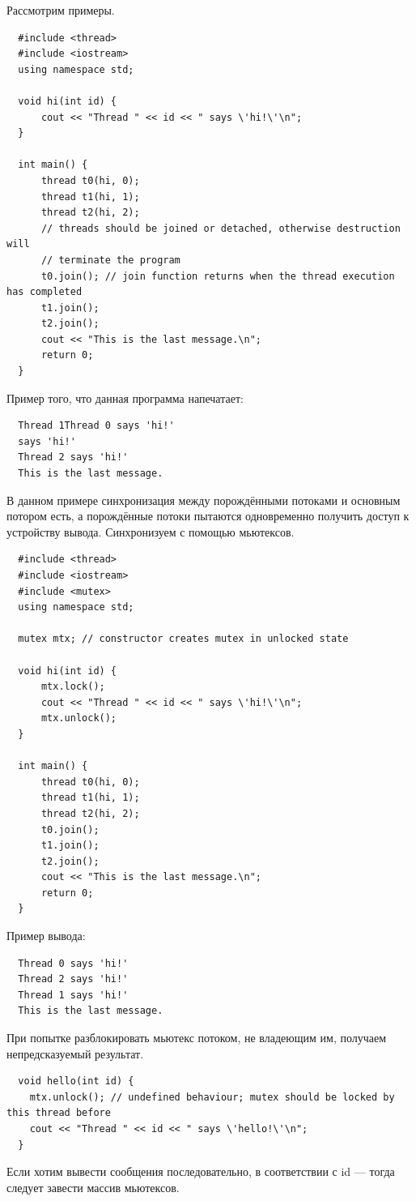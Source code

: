 \documentclass{book}
\begin{document}
Рассмотрим примеры.
\begin{verbatim}
  #include <thread>
  #include <iostream>
  using namespace std;

  void hi(int id) {
      cout << "Thread " << id << " says \'hi!\'\n";
  }

  int main() {
      thread t0(hi, 0);
      thread t1(hi, 1);
      thread t2(hi, 2);
      // threads should be joined or detached, otherwise destruction will
      // terminate the program
      t0.join(); // join function returns when the thread execution has completed
      t1.join();
      t2.join();
      cout << "This is the last message.\n";
      return 0;
  }
\end{verbatim}
Пример того, что данная программа напечатает:
\begin{verbatim}
  Thread 1Thread 0 says 'hi!'
  says 'hi!'
  Thread 2 says 'hi!'
  This is the last message.
\end{verbatim}
В данном примере синхронизация между порождёнными потоками и основным потором
есть, а порождённые потоки пытаются одновременно получить доступ к устройству
вывода. Синхронизуем с помощью мьютексов.
\begin{verbatim}
  #include <thread>
  #include <iostream>
  #include <mutex>
  using namespace std;

  mutex mtx; // constructor creates mutex in unlocked state

  void hi(int id) {
      mtx.lock();
      cout << "Thread " << id << " says \'hi!\'\n";
      mtx.unlock();
  }

  int main() {
      thread t0(hi, 0);
      thread t1(hi, 1);
      thread t2(hi, 2);
      t0.join();
      t1.join();
      t2.join();
      cout << "This is the last message.\n";
      return 0;
  }
\end{verbatim}
Пример вывода:
\begin{verbatim}
  Thread 0 says 'hi!'
  Thread 2 says 'hi!'
  Thread 1 says 'hi!'
  This is the last message.
\end{verbatim}
При попытке разблокировать мьютекс потоком, не владеющим им, получаем
непредсказуемый результат.
\begin{verbatim}
  void hello(int id) {
    mtx.unlock(); // undefined behaviour; mutex should be locked by this thread before
    cout << "Thread " << id << " says \'hello!\'\n";
  }
\end{verbatim}
Если хотим вывести сообщения последовательно, в соответствии с id --- тогда
следует завести массив мьютексов.
\end{document}
